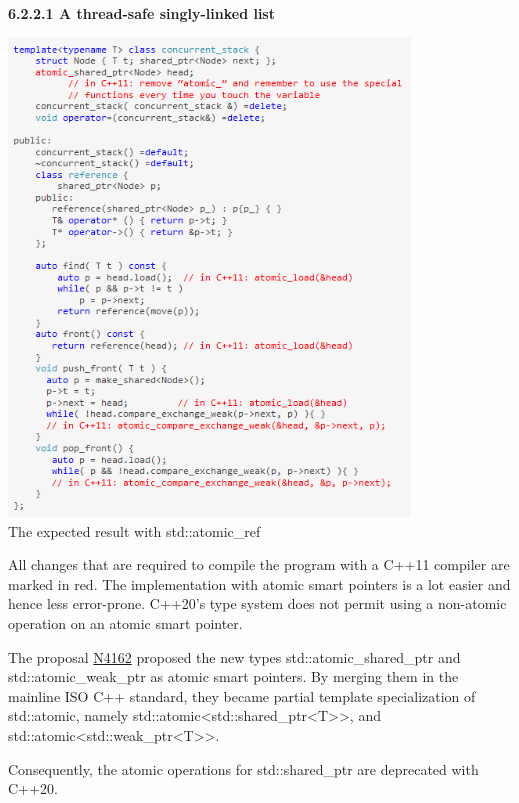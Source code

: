 \hspace*{\fill} \\ %
\noindent
\textbf{6.2.2.1\hspace{0.2cm} A thread-safe singly-linked list}

\begin{center}
\includegraphics[width=0.8\textwidth]{content/3/chapter6/images/11.png} \\
The expected result with std::atomic\_ref
\end{center}

All changes that are required to compile the program with a C++11 compiler are marked in red. The implementation with atomic smart pointers is a lot easier and hence less error-prone. C++20’s type system does not permit using a non-atomic operation on an atomic smart pointer.

The proposal \href{http://wg21.link/n4162}{N4162} proposed the new types std::atomic\_shared\_ptr and std::atomic\_weak\_ptr as atomic smart pointers. By merging them in the mainline ISO C++ standard, they became partial template specialization of std::atomic, namely std::atomic<std::shared\_ptr<T>{}>, and std::atomic<std::weak\_ptr<T>{}>.

Consequently, the atomic operations for std::shared\_ptr are deprecated with C++20.


